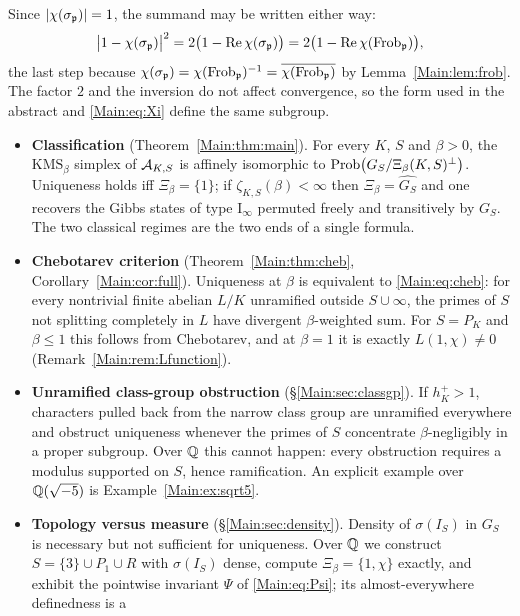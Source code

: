 Since $|\chi(\sigma_{\mathfrak{p}})|=1$, the summand may be written either way:
\begin{equation}\label{Main:eq:twoforms}
\bigl|1-\chi(\sigma_{\mathfrak{p}})\bigr|^2=2\bigl(1-\operatorname{Re}\chi(\sigma_{\mathfrak{p}})\bigr)
=2\bigl(1-\operatorname{Re}\chi(\operatorname{Frob}_{\mathfrak{p}})\bigr),
\end{equation}
the last step because $\chi(\sigma_{\mathfrak{p}})=\chi(\operatorname{Frob}_{\mathfrak{p}})^{-1}=\overline{\chi(\operatorname{Frob}_{\mathfrak{p}})}$
by Lemma~\ref{Main:lem:frob}. The factor $2$ and the inversion do not affect convergence, so
the form used in the abstract and \eqref{Main:eq:Xi} define the same subgroup.

\begin{itemize}
\item \textbf{Classification} (Theorem~\ref{Main:thm:main}). For every $K$, $S$ and
$\beta>0$, the $\mathrm{KMS}_\beta$ simplex of $\mathcal{A}_{K,S}$ is affinely
isomorphic to $\mathrm{Prob}\bigl(G_S/\Xi_\beta(K,S)^\perp\bigr)$. Uniqueness holds iff
$\Xi_\beta=\{1\}$; if $\zeta_{K,S}(\beta)<\infty$ then $\Xi_\beta=\widehat{G_S}$
and one recovers the Gibbs states of type $\mathrm I_\infty$ permuted freely
and transitively by $G_S$. The two classical regimes are the two ends of a
single formula.
\item \textbf{Chebotarev criterion} (Theorem~\ref{Main:thm:cheb},
Corollary~\ref{Main:cor:full}). Uniqueness at $\beta$ is equivalent to
\eqref{Main:eq:cheb}: for every nontrivial finite abelian $L/K$ unramified outside
$S\cup\infty$, the primes of $S$ not splitting completely in $L$ have divergent
$\beta$-weighted sum. For $S=P_K$ and $\beta\le1$ this follows from Chebotarev,
and at $\beta=1$ it is exactly $L(1,\chi)\neq0$ (Remark~\ref{Main:rem:Lfunction}).
\item \textbf{Unramified class-group obstruction} (\S\ref{Main:sec:classgp}). If
$h^+_K>1$, characters pulled back from the narrow class group are unramified
everywhere and obstruct uniqueness whenever the primes of $S$ concentrate
$\beta$-negligibly in a proper subgroup. Over $\mathbb{Q}$ this cannot happen: every
obstruction requires a modulus supported on $S$, hence ramification. An
explicit example over $\mathbb{Q}(\sqrt{-5})$ is Example~\ref{Main:ex:sqrt5}.
\item \textbf{Topology versus measure} (\S\ref{Main:sec:density}). Density of
$\sigma(I_S)$ in $G_S$ is necessary but not sufficient for uniqueness. Over
$\mathbb{Q}$ we construct $S=\{3\}\cup P_1\cup R$ with $\sigma(I_S)$ dense, compute
$\Xi_\beta=\{1,\chi\}$ exactly, and exhibit the pointwise invariant
$\Psi$ of \eqref{Main:eq:Psi}; its almost-everywhere definedness is a

\end{itemize}
